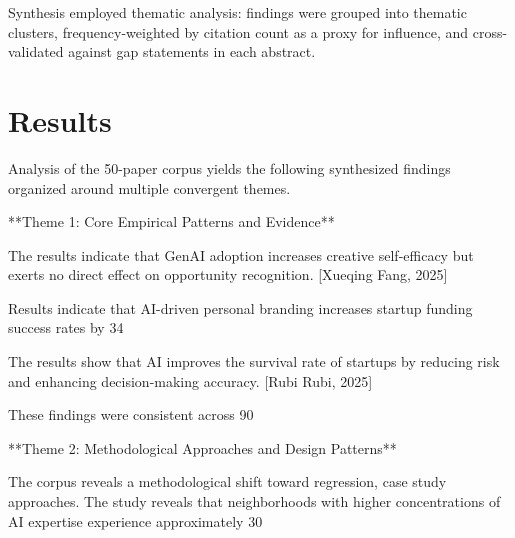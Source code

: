\documentclass[11pt, a4paper]{article}
\begin{document}
Synthesis employed thematic analysis: findings were grouped into thematic clusters, frequency-weighted by citation count as a proxy for influence, and cross-validated against gap statements in each abstract.

\section{Results}
Analysis of the 50-paper corpus yields the following synthesized findings organized around multiple convergent themes.

**Theme 1: Core Empirical Patterns and Evidence**

The results indicate that GenAI adoption increases creative self-efficacy but exerts no direct effect on opportunity recognition. [Xueqing Fang, 2025]

Results indicate that AI-driven personal branding increases startup funding success rates by 34%

The results show that AI improves the survival rate of startups by reducing risk and enhancing decision-making accuracy. [Rubi Rubi, 2025]

These findings were consistent across 90%

**Theme 2: Methodological Approaches and Design Patterns**

The corpus reveals a methodological shift toward regression, case study approaches. The study reveals that neighborhoods with higher concentrations of AI expertise experience approximately 30%
\end{document}
